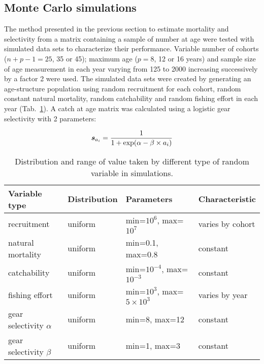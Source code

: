 \documentclass[12pt]{article}
\begin{document}
\subsection{Monte Carlo simulations}
\label{MCsimulation}

The method presented in the previous section to estimate mortality and selectivity from a matrix containing a sample of number at age were tested with simulated data sets to characterize their performance. Variable number of cohorts ($n+p-1 = 25$, 35 or 45); maximum age ($p=8$, 12 or 16 years) and sample size of age measurement in each year varying from 125 to 2000 increasing successively by a factor 2 were used. The simulated data sets were created by generating an age-structure population using random recruitment for each cohort, random constant natural mortality, random catchability and random fishing effort in each year (Tab.~\ref{tab:SimulationParameters.tex}). A catch at age matrix was calculated using a logistic gear selectivity with 2 parameters: 

\begin{equation}
\bm{s}_{a_{i}} = \frac{1}{1  + {\rm exp}( \alpha - \beta \times a_{i})}
\end{equation}


\begin{table}[ht]
\centering
\begin{tabular}{llll}
  \hline
Variable type & Distribution & Parameters & Characteristic \\
  \hline
recruitment               & uniform & min=$10^{6}$, max=$10^{7}$ & varies by cohort  \\
natural mortality         & uniform & min=0.1, max=0.8 & constant \\
catchability              & uniform & min=$10^{-4}$, max=$10^{-3}$ & constant \\
fishing effort            & uniform & min=$10^{3}$, max=$5 \times 10^{3}$ & varies by year  \\
gear selectivity $\alpha$ & uniform & min=8, max=12 & constant     \\
gear selectivity $\beta$  & uniform & min=1, max=3 & constant       \\
   \hline
\end{tabular}
\caption{Distribution and range of value taken by different type of random variable in simulations.}
\label{tab:SimulationParameters.tex}
\end{table}
\end{document}
